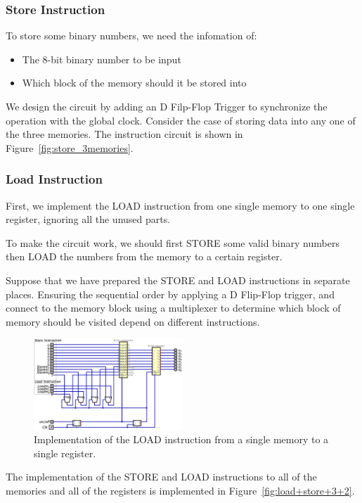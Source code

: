\documentclass[conference]{IEEEtran}
\begin{document}
\subsubsection{Store Instruction}
To store some binary numbers, we need the infomation of:
\begin{itemize}
    \item The 8-bit binary number to be input
    \item Which block of the memory should it be stored into
\end{itemize}

We design the circuit by adding an D Filp-Flop Trigger to synchronize the operation with the global clock. Consider the case of storing data into any one of the three memories. The instruction circuit is shown in Figure~\ref{fig:store_3memories}.




\subsubsection{Load Instruction}

First, we implement the LOAD instruction from one single memory to one single register, ignoring all the unused parts.

To make the circuit work, we should first STORE some valid binary numbers then LOAD the numbers from the memory to a certain register.


Suppose that we have prepared the STORE and LOAD instructions in separate places. Ensuring the sequential order by applying a D Flip-Flop trigger, and connect to the memory block using a multiplexer to determine which block of memory should be 
visited depend on different instructions.

\begin{figure}[h!]
    \centering
    \includegraphics[width=0.5\textwidth]{assets/load.png}
    \caption{Implementation of the LOAD instruction from a single memory to a single register.}
    \label{fig:load}
\end{figure}


The implementation of the STORE and LOAD instructions to all of the memories and all of the registers is implemented in Figure~\ref{fig:load+store+3+2}.
\end{document}
